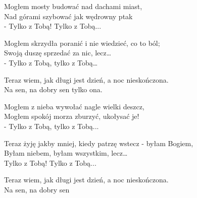 \begin{text}
    Mogłem mosty budować nad dachami miast,\\
    Nad górami szybować jak wędrowny ptak\\
    - Tylko z Tobą! Tylko z Tobą...

    Mogłem skrzydła poranić i nie wiedzieć, co to ból;\\
    Swoją duszę sprzedać za nic, lecz…\\
    - Tylko z Tobą, tylko z Tobą…

    Teraz wiem, jak długi jest dzień, a noc nieskończona.\\
    Na sen, na dobry sen tylko ona.

    Mogłem z nieba wywołać nagle wielki deszcz,\\
    Mogłem spokój morza zburzyć, ukołysać je!\\
    - Tylko z Tobą, tylko z Tobą...

    Teraz żyję jakby mniej, kiedy patrzę wstecz - byłam Bogiem,\\
    Byłam niebem, byłam wszystkim, lecz…\\
    Tylko z Tobą! Tylko z Tobą...

    Teraz wiem, jak długi jest dzień, a noc nieskończona.\\
    Na sen, na dobry sen
\end{text}
\begin{chord}

\end{chord}